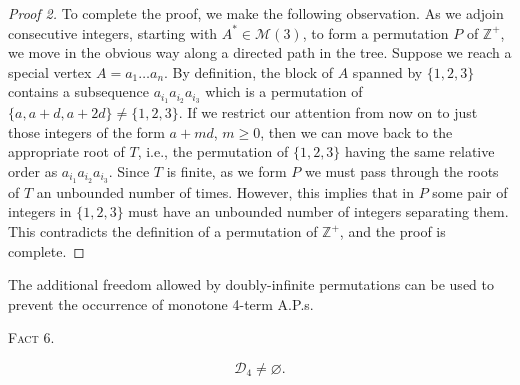 \documentclass[10pt]{article}
\newcommand{\Zpos}{\mathbb{Z}^{+}}
\newcommand{\Mcal}{\mathscr{M}}
\newcommand{\Dcal}{\mathscr{D}}
\newcommand{\fact}[1]{\par\medskip\noindent\textsc{Fact #1.}\par\smallskip}
\begin{document}
\begin{proof}[Proof 2]
To complete the proof, we make the following observation. As we adjoin
consecutive integers, starting with $A^*\in\Mcal(3)$, to form a
permutation $P$ of $\Zpos$, we move in the obvious way along a directed
path in the tree. Suppose we reach a special vertex
$A=a_1\ldots a_n$. By definition, the block of $A$ spanned by
$\{1,2,3\}$ contains a subsequence $a_{i_1}a_{i_2}a_{i_3}$ which is a
permutation of $\{a,a+d,a+2d\}\ne\{1,2,3\}$. If we restrict our attention
from now on to just those integers of the form $a+md$, $m\ge0$, then we
can move back to the appropriate root of $T$, i.e., the permutation of
$\{1,2,3\}$ having the same relative order as
$a_{i_1}a_{i_2}a_{i_3}$. Since $T$ is finite, as we form $P$ we must pass
through the roots of $T$ an unbounded number of times. However, this
implies that in $P$ some pair of integers in $\{1,2,3\}$ must have an
unbounded number of integers separating them. This contradicts the
definition of a permutation of $\Zpos$, and the proof is complete.
\end{proof}

The additional freedom allowed by doubly-infinite permutations can be
used to prevent the occurrence of monotone 4-term A.P.s.

\fact{6}
\[
 \Dcal_4\ne\varnothing.
\]
\end{document}
